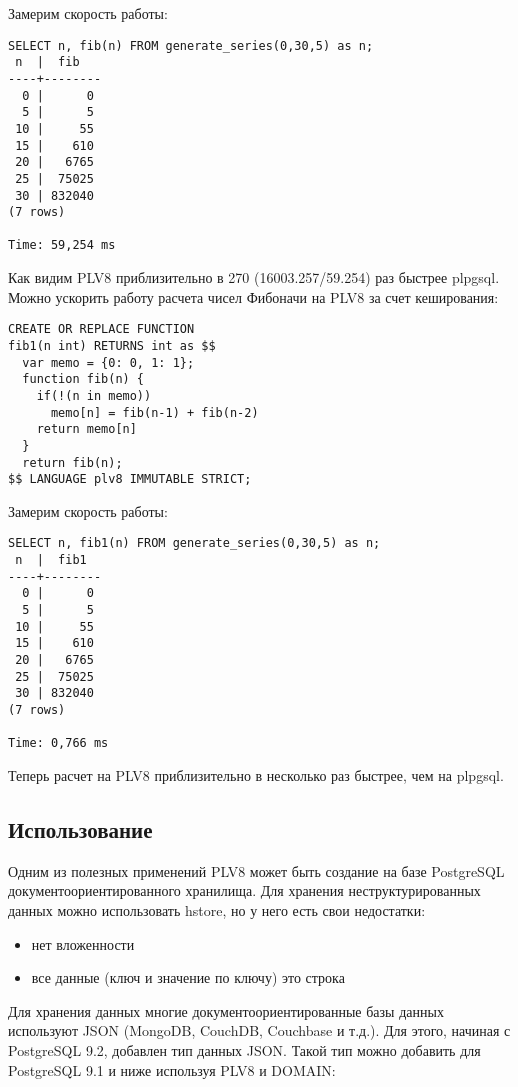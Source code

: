 Замерим скорость работы:

\begin{lstlisting}[label=lst:plv8js4,caption=Скорость расчета числа Фибоначчи на plv8]
SELECT n, fib(n) FROM generate_series(0,30,5) as n;
 n  |  fib
----+--------
  0 |      0
  5 |      5
 10 |     55
 15 |    610
 20 |   6765
 25 |  75025
 30 | 832040
(7 rows)

Time: 59,254 ms
\end{lstlisting}

Как видим PLV8 приблизительно в 270 (16003.257/59.254) раз быстрее plpgsql. Можно ускорить работу расчета чисел Фибоначи на PLV8 за счет кеширования:

\begin{lstlisting}[label=lst:plv8js5,caption=Фибоначчи на plv8]
CREATE OR REPLACE FUNCTION
fib1(n int) RETURNS int as $$
  var memo = {0: 0, 1: 1};
  function fib(n) {
    if(!(n in memo))
      memo[n] = fib(n-1) + fib(n-2)
    return memo[n]
  }
  return fib(n);
$$ LANGUAGE plv8 IMMUTABLE STRICT;
\end{lstlisting}

Замерим скорость работы:

\begin{lstlisting}[label=lst:plv8js6,caption=Скорость расчета числа Фибоначчи на plv8]
SELECT n, fib1(n) FROM generate_series(0,30,5) as n;
 n  |  fib1
----+--------
  0 |      0
  5 |      5
 10 |     55
 15 |    610
 20 |   6765
 25 |  75025
 30 | 832040
(7 rows)

Time: 0,766 ms
\end{lstlisting}

Теперь расчет на PLV8 приблизительно в несколько раз быстрее, чем на plpgsql.

\subsection{Использование}

Одним из полезных применений PLV8 может быть создание на базе PostgreSQL документоориентированного хранилища. Для хранения неструктурированных данных можно использовать hstore, но у него есть свои недостатки:

\begin{itemize}
\item нет вложенности
\item все данные (ключ и значение по ключу) это строка
\end{itemize}

Для хранения данных многие документоориентированные базы данных используют JSON (MongoDB, CouchDB, Couchbase и т.д.). Для этого, начиная с PostgreSQL 9.2, добавлен тип данных JSON. Такой тип можно добавить для PostgreSQL 9.1 и ниже используя PLV8 и DOMAIN:

